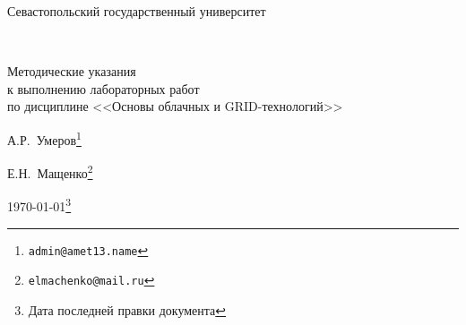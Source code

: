 
\begin{center}
\Large{Севастопольский государственный университет}
\end{center}

{~}\bigskip %

\begin{center}
\Huge{Методические указания \\
к выполнению лабораторных работ \\
по дисциплине <<Основы облачных и GRID-технологий>>} %

\vspace{1em}
\Large{А.Р.~Умеров}\footnote{\texttt{admin@amet13.name}} %

\Large{Е.Н.~Мащенко}\footnote{\texttt{elmachenko@mail.ru}} %

\Large{\today}\footnote{Дата последней правки документа} %
\end{center}

\clearpage %
